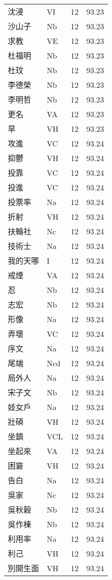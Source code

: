 \documentclass[twocolumn]{book}
\begin{document}
\begin{supertabular}{llrr}
沈浸 & VI & 12 &  93.23\\
沙山子 & Nb & 12 &  93.23\\
求教 & VE & 12 &  93.23\\
杜福明 & Nb & 12 &  93.23\\
杜玟 & Nb & 12 &  93.23\\
李德榮 & Nb & 12 &  93.23\\
李明哲 & Nb & 12 &  93.23\\
更名 & VA & 12 &  93.23\\
旱 & VH & 12 &  93.23\\
攻進 & VC & 12 &  93.24\\
抑鬱 & VH & 12 &  93.24\\
投靠 & VC & 12 &  93.24\\
投進 & VC & 12 &  93.24\\
投票率 & Na & 12 &  93.24\\
折射 & VH & 12 &  93.24\\
扶輪社 & Nc & 12 &  93.24\\
技術士 & Na & 12 &  93.24\\
我的天哪 & I & 12 &  93.24\\
戒煙 & VA & 12 &  93.24\\
忍 & Nb & 12 &  93.24\\
志宏 & Nb & 12 &  93.24\\
形像 & Na & 12 &  93.24\\
弄壞 & VC & 12 &  93.24\\
序文 & Na & 12 &  93.24\\
尾端 & Ncd & 12 &  93.24\\
局外人 & Na & 12 &  93.24\\
宋子文 & Nb & 12 &  93.24\\
妓女戶 & Na & 12 &  93.24\\
壯碩 & VH & 12 &  93.24\\
坐鎮 & VCL & 12 &  93.24\\
坐起來 & VA & 12 &  93.24\\
困窘 & VH & 12 &  93.24\\
告白 & Na & 12 &  93.24\\
吳家 & Nc & 12 &  93.24\\
吳秋穀 & Nb & 12 &  93.24\\
吳作棟 & Nb & 12 &  93.24\\
利用率 & Na & 12 &  93.24\\
利己 & VH & 12 &  93.24\\
別開生面 & VH & 12 &  93.24\\

\end{supertabular}
\end{document}
